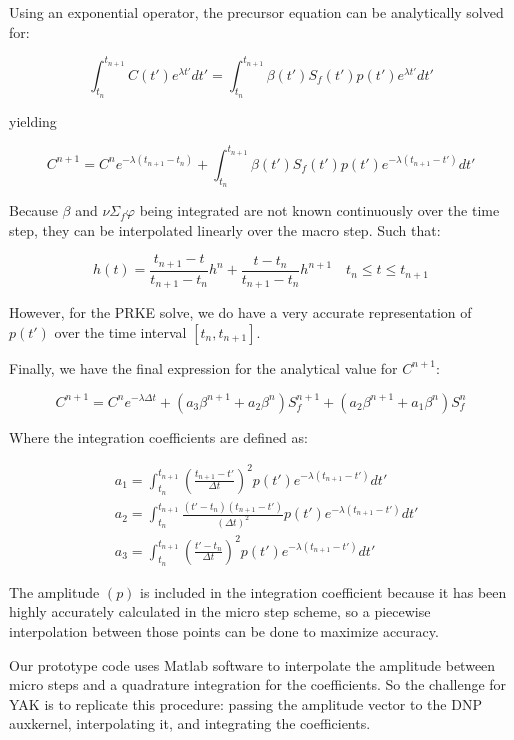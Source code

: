 \documentclass[11pt]{tamurmemo}
\newcommand{\be}{\begin{equation}}
\newcommand{\ee}{\end{equation}}
\begin{document}
Using an exponential operator, the precursor equation can be analytically solved for:

\be
\int_{t_n}^{t_{n+1}} C(t')e^{\lambda t'} dt' = \int_{t_n}^{t_{n+1}} \beta(t') S_f(t') p(t')e^{\lambda t'}dt'
\ee

yielding

\be
C^{n+1} =  C^n e^{-\lambda (t_{n+1} - t_n) }  + \int_{t_n}^{t_{n+1}} \beta(t') S_f(t') p(t')e^{-\lambda (t_{n+1}-t')}dt'
\ee

Because $\beta$ and $\nu\Sigma_f\varphi$ being integrated are not known continuously over the time step, they can be interpolated linearly over the macro step.  Such that:

\be
h(t) = \frac{t_{n+1}-t}{t_{n+1}-t_n}h^n  + \frac{t-t_n}{t_{n+1}-t_n}h^{n+1}  \quad t_n \le t \le t_{n+1}
\ee

However, for the PRKE solve, we do have a very accurate representation of $p(t')$ over the time interval $[t_n,t_{n+1}]$.

Finally, we have the final expression for the analytical value for $C^{n+1}$:

\be
C^{n+1} = C^n e^{-\lambda \Delta t} 
+ \left(a_3\beta^{n+1}+a_2\beta^n\right)S_f^{n+1}
+ \left(a_2\beta^{n+1}+a_1\beta^n\right)S_f^n 
\ee

Where the integration coefficients are defined as:

\begin{align}
&a_1 = \int_{t_n}^{t_{n+1}}\left(\frac{t_{n+1}-t'}{\Delta t}\right)^2p(t')e^{-\lambda(t_{n+1}-t')}dt' \\
&a_2= \int_{t_n}^{t_{n+1}}\frac{(t'-t_n)(t_{n+1}-t')}{(\Delta t)^2}p(t')e^{-\lambda(t_{n+1}-t')}dt' \\
&a_3 = \int_{t_n}^{t_{n+1}}\left(\frac{t'-t_n}{\Delta t}\right)^2p(t')e^{-\lambda(t_{n+1}-t')}dt'
\end{align}

The amplitude $(p)$ is included in the integration coefficient because it has been highly accurately calculated in the micro step scheme, so a piecewise interpolation between those points can be done to maximize accuracy.  

Our prototype code uses Matlab software to interpolate the amplitude between micro steps and a quadrature integration for the coefficients.  So the challenge for YAK is to replicate this procedure: passing the amplitude vector to the DNP auxkernel, interpolating it, and integrating the coefficients.  
\end{document}
